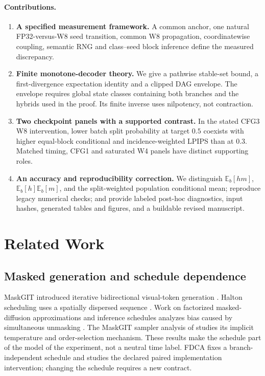 \documentclass[11pt,a4paper]{article}
\theoremstyle{plain}
\theoremstyle{definition}
\theoremstyle{remark}
\newcommand{\Ex}{\mathbb{E}}
\begin{document}
\paragraph{Contributions.}
\begin{enumerate}[leftmargin=1.6em,itemsep=3pt]
\item \textbf{A specified measurement framework.} A common anchor, one natural
FP32-versus-W8 seed transition, common W8 propagation, coordinatewise coupling,
semantic RNG and class--seed block inference define the measured discrepancy.
\item \textbf{Finite monotone-decoder theory.} We give a pathwise stable-set
bound, a first-divergence expectation identity and a clipped DAG envelope.
The envelope requires global state classes containing both branches and the
hybrids used in the proof. Its finite inverse uses nilpotency, not contraction.
\item \textbf{Two checkpoint panels with a supported contrast.} In the stated
CFG3 W8 intervention, lower batch split probability at target $0.5$ coexists
with higher equal-block conditional and incidence-weighted LPIPS than at $0.3$.
Matched timing, CFG1 and saturated W4 panels have distinct supporting roles.
\item \textbf{An accuracy and reproducibility correction.} We distinguish
$\Ex_b[hm]$, $\Ex_b[h]\Ex_b[m]$, and the split-weighted population conditional
mean; reproduce legacy numerical checks; and provide labeled post-hoc diagnostics,
input hashes, generated tables and figures, and a buildable revised manuscript.
\end{enumerate}

\section{Related Work}
\label{sec:related}
\subsection{Masked generation and schedule dependence}
MaskGIT introduced iterative bidirectional visual-token generation
\citep{chang2022maskgit}. Halton scheduling uses a spatially dispersed sequence
\citep{halton1960efficiency,besnier2025halton}.
Work on factorized masked-diffusion approximations and inference schedules
analyzes bias caused by simultaneous unmasking
\citep{park2025jump,lavenant2025error,chen2026optimal}.
The MaskGIT sampler analysis of \citet{hayakawa2025demystifying} studies its
implicit temperature and order-selection mechanism. These results make the
schedule part of the model of the experiment, not a neutral time label.
FDCA fixes a branch-independent schedule and studies the declared paired
implementation intervention; changing the schedule requires a new contract.
\end{document}

